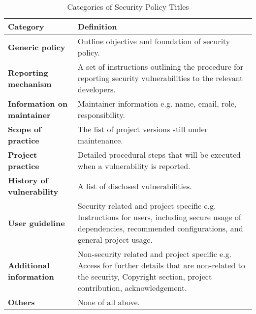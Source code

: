 \begin{table}[tb]
\centering
\begin{tabular}{lp{4.75cm}}
\toprule
\textbf{Category} & \textbf{Definition} \\
\midrule
\textbf{Generic policy} & Outline objective and foundation of security policy. \\
\textbf{Reporting mechanism} & A set of instructions outlining the procedure for reporting security vulnerabilities to the relevant developers. \\
\textbf{Information on maintainer} & Maintainer information e.g. name, email, role, responsibility. \\
\textbf{Scope of practice} & The list of project versions still under maintenance. \\
\textbf{Project practice} & Detailed procedural steps that will be executed when a vulnerability is reported. \\
\textbf{History of vulnerability} & A list of disclosed vulnerabilities. \\
\textbf{User guideline} & Security related and project specific e.g. Instructions for users, including secure usage of dependencies, recommended configurations, and general project usage. \\
\textbf{Additional information} & Non-security related and project specific e.g. Access for further details that are non-related to the security, Copyright section, project contribution, acknowledgement. \\
\textbf{Others} & None of all above. \\
\bottomrule
\end{tabular}
\caption{Categories of Security Policy Titles}
\label{}
\end{table}

